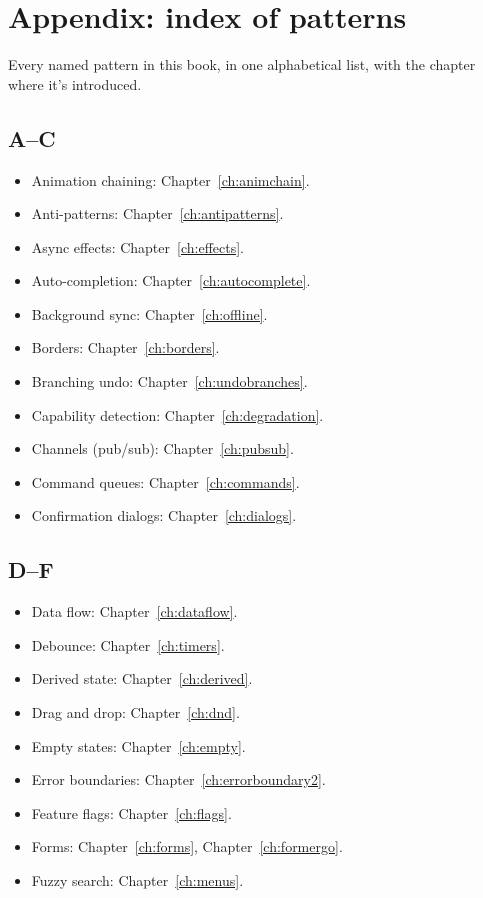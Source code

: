 \chapter{Appendix: index of patterns}
\label{ch:patternindex}

\begin{aside}
Every named pattern in this book, in one alphabetical list,
with the chapter where it's introduced.
\end{aside}

\section{A--C}

\begin{itemize}[leftmargin=*]
  \item Animation chaining: Chapter~\ref{ch:animchain}.
  \item Anti-patterns: Chapter~\ref{ch:antipatterns}.
  \item Async effects: Chapter~\ref{ch:effects}.
  \item Auto-completion: Chapter~\ref{ch:autocomplete}.
  \item Background sync: Chapter~\ref{ch:offline}.
  \item Borders: Chapter~\ref{ch:borders}.
  \item Branching undo: Chapter~\ref{ch:undobranches}.
  \item Capability detection:
    Chapter~\ref{ch:degradation}.
  \item Channels (pub/sub): Chapter~\ref{ch:pubsub}.
  \item Command queues: Chapter~\ref{ch:commands}.
  \item Confirmation dialogs: Chapter~\ref{ch:dialogs}.
\end{itemize}

\section{D--F}

\begin{itemize}[leftmargin=*]
  \item Data flow: Chapter~\ref{ch:dataflow}.
  \item Debounce: Chapter~\ref{ch:timers}.
  \item Derived state: Chapter~\ref{ch:derived}.
  \item Drag and drop: Chapter~\ref{ch:dnd}.
  \item Empty states: Chapter~\ref{ch:empty}.
  \item Error boundaries:
    Chapter~\ref{ch:errorboundary2}.
  \item Feature flags: Chapter~\ref{ch:flags}.
  \item Forms: Chapter~\ref{ch:forms},
    Chapter~\ref{ch:formergo}.
  \item Fuzzy search: Chapter~\ref{ch:menus}.
\end{itemize}

